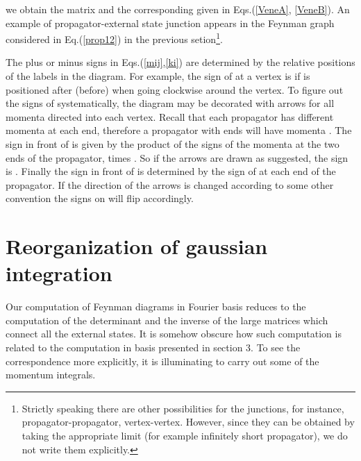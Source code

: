 \documentclass[a4paper,11pt]{article}
\begin{document}
\coordHE{} we obtain the \coordHE{} matrix \coordHE{} and
the corresponding \coordHE{} given in Eqs.(\ref{VeneA},
\ref{VeneB}).
An example of propagator-external state junction appears in the
Feynman graph considered in Eq.(\ref{prop12}) in the
previous setion\footnote{%
Strictly speaking there are other possibilities for
the junctions, for instance, propagator-propagator, vertex-vertex.
However, since they can be obtained by taking the appropriate
limit (for example infinitely short propagator), we do not write
them explicitly.}.
%
%

The plus or minus signs in Eqs.(\ref{mij},\ref{ki}) are determined
by the relative positions of the labels \coordHE{} in the diagram. For
example, the sign of \coordHE{} at a vertex is \myHighlight{$+(-)$}\coordHE{} if \coordHE{} is positioned after 
(before) \coordHE{} when going clockwise around the vertex.
To figure out the signs of \coordHE{} systematically, the diagram may 
be decorated with arrows for all momenta directed into each 
vertex. Recall that each propagator has different momenta at each 
end, therefore a propagator with ends \coordHE{} will have momenta 
\coordHE{}. The sign in front of \coordHE{} is given by the 
product of the signs of the momenta at the two ends of the 
propagator, times \coordHE{}. So if the arrows are drawn as suggested, 
the sign is \coordHE{}. Finally the sign in front of \coordHE{} is determined by 
the sign of \coordHE{} at each end of the propagator. If the 
direction of the arrows is changed according to some other 
convention the signs on \coordHE{} will flip accordingly.



\section{Reorganization of gaussian integration}


Our computation of Feynman diagrams in Fourier basis reduces to the
computation of the determinant and the inverse of the large matrices which
connect all the external states. It is somehow obscure how such computation
is related to the computation in \myHighlight{$\xi$}\coordHE{} basis presented in section 3. To see
the correspondence more explicitly, it is illuminating to carry out some of
the momentum integrals.
\end{document}
